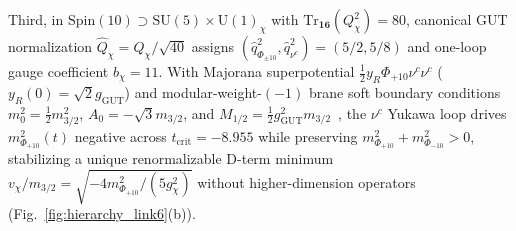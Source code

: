 \documentclass[aps,prd,twocolumn,nofootinbib,floatfix]{revtex4-2}
\begin{document}
Third, in $\mathrm{Spin}(10) \supset \mathrm{SU}(5)\times\mathrm{U}(1)_\chi$ with $\mathrm{Tr}_{\mathbf{16}}(Q_\chi^2) = 80$, canonical GUT normalization $\hat{Q}_\chi = Q_\chi/\sqrt{40}$ assigns $(\hat{q}_{\Phi_{\pm 10}}^2, \hat{q}_{\nu^c}^2) = (5/2, 5/8)$ and one-loop gauge coefficient $b_\chi = 11$.
With Majorana superpotential $\frac{1}{2}y_R\Phi_{+10}\nu^c\nu^c$ ($y_R(0) = \sqrt{2}g_{\mathrm{GUT}}$) and modular-weight-$(-1)$ brane soft boundary conditions $m_0^2 = \frac{1}{2}m_{3/2}^2$, $A_0 = -\sqrt{3}m_{3/2}$, and $M_{1/2} = \frac{1}{2}g_{\mathrm{GUT}}^2 m_{3/2}$~\cite{KaplunovskyLouis1993}, the $\nu^c$ Yukawa loop drives $m_{\Phi_{+10}}^2(t)$ negative across $t_{\mathrm{crit}} = -8.955$ while preserving $m_{\Phi_{+10}}^2 + m_{\Phi_{-10}}^2 > 0$, stabilizing a unique renormalizable D-term minimum $v_\chi/m_{3/2} = \sqrt{-4 m_{\Phi_{+10}}^2/(5 g_\chi^2)}$ without higher-dimension operators (Fig.~\ref{fig:hierarchy_link6}(b)).
\end{document}
